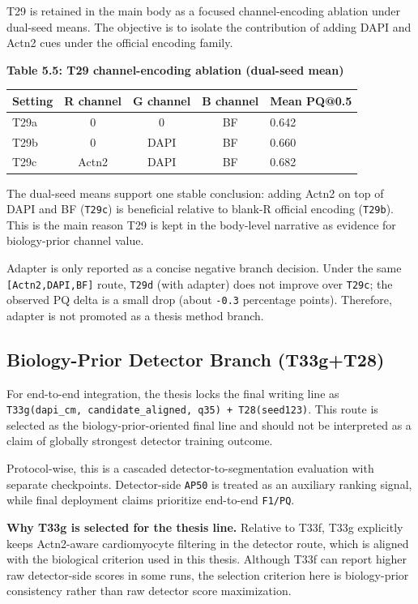 T29 is retained in the main body as a focused channel-encoding ablation under dual-seed means. The objective is to isolate the contribution of adding DAPI and Actn2 cues under the official encoding family.

\textbf{Table 5.5: T29 channel-encoding ablation (dual-seed mean)}

{%
\begin{longtable}[]{@{}lcccl@{}}
\toprule\noalign{}
Setting & R channel & G channel & B channel & Mean PQ@0.5 \\
\midrule\noalign{}
\endhead
\bottomrule\noalign{}
\endlastfoot
T29a & 0 & 0 & BF & 0.642 \\
T29b & 0 & DAPI & BF & 0.660 \\
T29c & Actn2 & DAPI & BF & 0.682 \\
\end{longtable}
}

The dual-seed means support one stable conclusion: adding Actn2 on top of DAPI and BF (\texttt{T29c}) is beneficial relative to blank-R official encoding (\texttt{T29b}). This is the main reason T29 is kept in the body-level narrative as evidence for biology-prior channel value.

Adapter is only reported as a concise negative branch decision. Under the same \texttt{[Actn2,DAPI,BF]} route, \texttt{T29d} (with adapter) does not improve over \texttt{T29c}; the observed PQ delta is a small drop (about \texttt{-0.3} percentage points). Therefore, adapter is not promoted as a thesis method branch.

\subsection{Biology-Prior Detector Branch (\texorpdfstring{T33g+T28}{T33g+T28})}\label{biology-prior-detector-branch-t33g-t28}

For end-to-end integration, the thesis locks the final writing line as \texttt{T33g(dapi\_cm,\ candidate\_aligned,\ q35) + T28(seed123)}. This route is selected as the biology-prior-oriented final line and should not be interpreted as a claim of globally strongest detector training outcome.

Protocol-wise, this is a cascaded detector-to-segmentation evaluation with separate checkpoints. Detector-side \texttt{AP50} is treated as an auxiliary ranking signal, while final deployment claims prioritize end-to-end \texttt{F1/PQ}.

\textbf{Why T33g is selected for the thesis line.}
Relative to T33f, T33g explicitly keeps Actn2-aware cardiomyocyte filtering in the detector route, which is aligned with the biological criterion used in this thesis. Although T33f can report higher raw detector-side scores in some runs, the selection criterion here is biology-prior consistency rather than raw detector score maximization.

